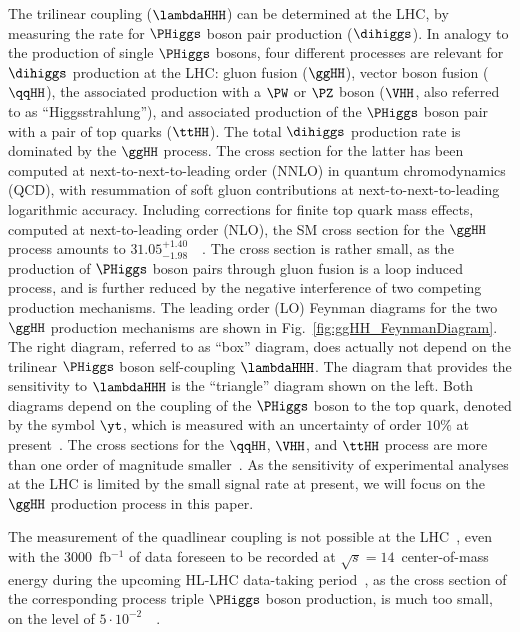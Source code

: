The trilinear coupling ($\lambdaHHH$) can be determined at the LHC, by measuring the rate for $\PHiggs$ boson pair production ($\dihiggs$). 
In analogy to the production of single $\PHiggs$ bosons, 
four different processes are relevant for $\dihiggs$ production at the LHC: 
gluon fusion ($\ggHH$), vector boson fusion ($\qqHH$), the associated production with a $\PW$ or $\PZ$ boson ($\VHH$, also referred to as ``Higgsstrahlung''),
and associated production of the $\PHiggs$ boson pair with a pair of top quarks ($\ttHH$).
The total $\dihiggs$ production rate is dominated by the $\ggHH$ process.
The cross section for the latter has been computed at next-to-next-to-leading order (NNLO) in quantum chromodynamics (QCD),
with resummation of soft gluon contributions at next-to-next-to-leading logarithmic accuracy.
Including corrections for finite top quark mass effects, computed at next-to-leading order (NLO),
the SM cross section for the $\ggHH$ process amounts to $31.05^{+1.40}_{-1.98}$~\fb~\cite{Grazzini:2018hh}.
The cross section is rather small, as the production of $\PHiggs$ boson pairs through gluon fusion is a loop induced process,
and is further reduced by the negative interference of two competing production mechanisms.
The leading order (LO) Feynman diagrams for the two $\ggHH$ production mechanisms are shown in Fig.~\ref{fig:ggHH_FeynmanDiagram}.
The right diagram, referred to as ``box'' diagram, does actually not depend on the trilinear $\PHiggs$ boson self-coupling $\lambdaHHH$.
The diagram that provides the sensitivity to $\lambdaHHH$ is the ``triangle'' diagram shown on the left.
Both diagrams depend on the coupling of the $\PHiggs$ boson to the top quark, denoted by the symbol $\yt$,
which is measured with an uncertainty of order $10\%$ at present~\cite{Aaboud:2018urx,HIG-17-035}.
The cross sections for the $\qqHH$, $\VHH$, and $\ttHH$ process are more than one order of magnitude smaller~\cite{Baglio:2012np}.
As the sensitivity of experimental analyses at the LHC is limited by the small signal rate at present,
we will focus on the $\ggHH$ production process in this paper.

The measurement of the quadlinear coupling is not possible at the LHC~\cite{deFlorian:2019app}, 
even with the $3000$~fb$^{-1}$ of data foreseen to be recorded at $\sqrt{s}=14$~\TeV center-of-mass energy during the upcoming HL-LHC data-taking period~\cite{HL-LHC-TDR},
as the cross section of the corresponding process triple $\PHiggs$ boson production, is much too small, 
on the level of $5 \cdot 10^{-2}$~\fb~\cite{Plehn:2005nk,Binoth:2006ym}.

